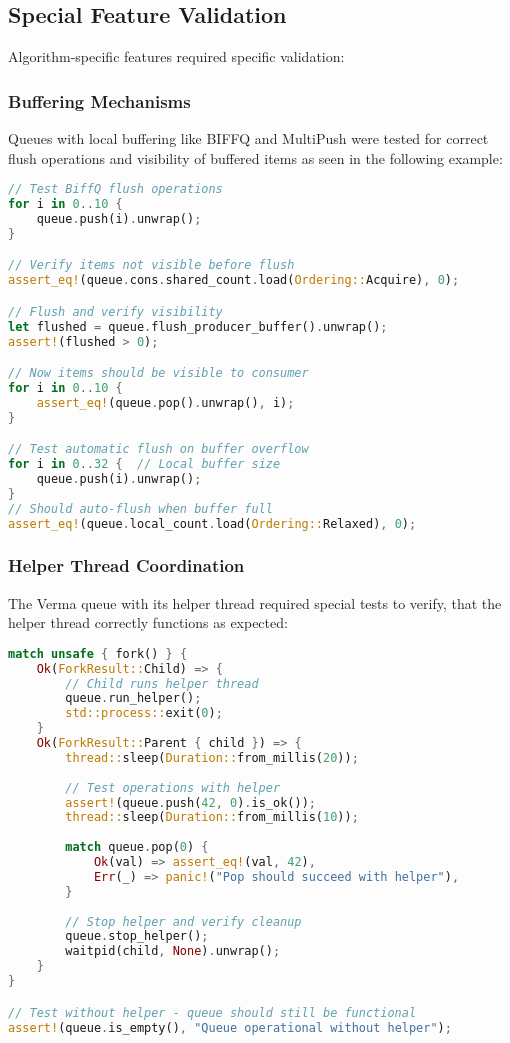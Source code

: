 \subsection{Special Feature Validation}
Algorithm-specific features required specific validation:

\subsubsection{Buffering Mechanisms}
Queues with local buffering like \ac{BIFFQ} and MultiPush were tested for correct flush operations and visibility of buffered items as seen in the following example:

\begin{lstlisting}[language=Rust, style=boxed, caption={Buffer mechanism test}, label={lst:buffer-test}]
// Test BiffQ flush operations
for i in 0..10 {
    queue.push(i).unwrap();
}

// Verify items not visible before flush
assert_eq!(queue.cons.shared_count.load(Ordering::Acquire), 0);

// Flush and verify visibility
let flushed = queue.flush_producer_buffer().unwrap();
assert!(flushed > 0);

// Now items should be visible to consumer
for i in 0..10 {
    assert_eq!(queue.pop().unwrap(), i);
}

// Test automatic flush on buffer overflow
for i in 0..32 {  // Local buffer size
    queue.push(i).unwrap();
}
// Should auto-flush when buffer full
assert_eq!(queue.local_count.load(Ordering::Relaxed), 0);
\end{lstlisting}

\subsubsection{Helper Thread Coordination}
The Verma queue with its helper thread required special tests to verify, that the helper thread correctly functions as expected:

\begin{lstlisting}[language=Rust, style=boxed, caption={Helper thread coordination test}, label={lst:helper-thread-test}]
match unsafe { fork() } {
    Ok(ForkResult::Child) => {
        // Child runs helper thread
        queue.run_helper();
        std::process::exit(0);
    }
    Ok(ForkResult::Parent { child }) => {
        thread::sleep(Duration::from_millis(20));
        
        // Test operations with helper
        assert!(queue.push(42, 0).is_ok());
        thread::sleep(Duration::from_millis(10));
        
        match queue.pop(0) {
            Ok(val) => assert_eq!(val, 42),
            Err(_) => panic!("Pop should succeed with helper"),
        }
        
        // Stop helper and verify cleanup
        queue.stop_helper();
        waitpid(child, None).unwrap();
    }
}

// Test without helper - queue should still be functional
assert!(queue.is_empty(), "Queue operational without helper");
\end{lstlisting}

